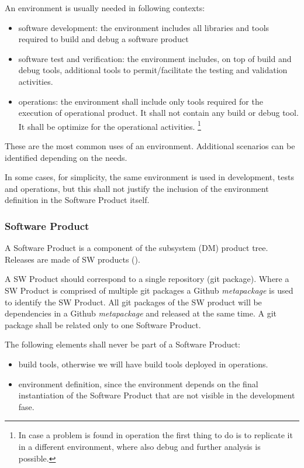 An environment is usually needed in following contexts:

\begin{itemize}
\item software development: the environment includes all libraries and tools required to build and debug a software product
\item software test and verification: the environment includes, on top of build and debug tools, additional tools to permit/facilitate the testing and validation activities.
\item operations: the environment shall include only tools required for the execution of operational product. It shall not contain any build or debug tool. It shall be optimize for the operational activities. \footnote{In case a problem is found in operation the first thing to do is to replicate it in a different environment, where also debug and further analysis is possible.}
\end{itemize}

These are the most common uses of an environment. Additional scenarios can be identified depending on the needs.

In some cases, for simplicity, the same environment is used in development, tests and operations, but this shall not justify the inclusion of the environment definition in the Software Product itself.


\subsubsection{Software Product} \label{sec:swdef}

A Software Product is a component of the subsystem (DM) product tree.
Releases are made of  SW products ().

A SW Product should correspond to a single repository (git package).
Where a SW Product is comprised of multiple git packages
a Github \textit{metapackage} is used to identify the SW Product.
All git packages of the SW product will be dependencies in a Github \textit{metapackage} and released at the same time.
A git package shall be related only to one Software Product.

The following elements shall never be part of a Software Product:

\begin{itemize}
\item build tools, otherwise we will have build tools deployed in operations.
\item environment definition, since the environment depends on the final instantiation of the Software Product that are not visible in the development fase.
\end{itemize}


